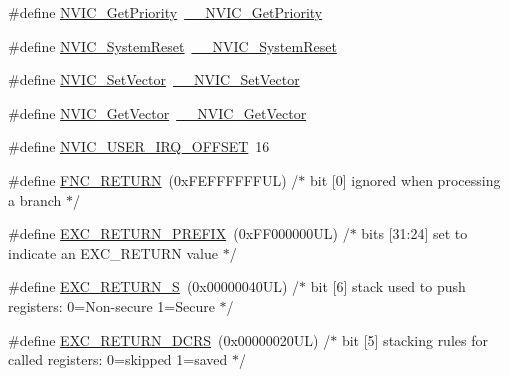 \begin{DoxyCompactItemize}
\item 
\#define \hyperlink{group___c_m_s_i_s___core___n_v_i_c_functions_gaf59b9d0a791d2157abb319753953eceb}{N\+V\+I\+C\+\_\+\+Get\+Priority}~\hyperlink{group___c_m_s_i_s___core___n_v_i_c_functions_gaeb9dc99c8e7700668813144261b0bc73}{\+\_\+\+\_\+\+N\+V\+I\+C\+\_\+\+Get\+Priority}
\item 
\#define \hyperlink{group___c_m_s_i_s___core___n_v_i_c_functions_ga6aa0367d3642575610476bf0366f0c48}{N\+V\+I\+C\+\_\+\+System\+Reset}~\hyperlink{group___c_m_s_i_s___core___n_v_i_c_functions_ga0d9aa2d30fa54b41eb780c16e35b676c}{\+\_\+\+\_\+\+N\+V\+I\+C\+\_\+\+System\+Reset}
\item 
\#define \hyperlink{group___c_m_s_i_s___core___n_v_i_c_functions_ga804af63bb4c4c317387897431814775d}{N\+V\+I\+C\+\_\+\+Set\+Vector}~\hyperlink{group___c_m_s_i_s___core___n_v_i_c_functions_ga0df355460bc1783d58f9d72ee4884208}{\+\_\+\+\_\+\+N\+V\+I\+C\+\_\+\+Set\+Vector}
\item 
\#define \hyperlink{group___c_m_s_i_s___core___n_v_i_c_functions_ga955eb1c33a3dcc62af11a8385e8c0fc8}{N\+V\+I\+C\+\_\+\+Get\+Vector}~\hyperlink{group___c_m_s_i_s___core___n_v_i_c_functions_ga44b665d2afb708121d9b10c76ff00ee5}{\+\_\+\+\_\+\+N\+V\+I\+C\+\_\+\+Get\+Vector}
\item 
\#define \hyperlink{group___c_m_s_i_s___core___n_v_i_c_functions_ga8045d905a5ca57437d8e6f71ffcb6df5}{N\+V\+I\+C\+\_\+\+U\+S\+E\+R\+\_\+\+I\+R\+Q\+\_\+\+O\+F\+F\+S\+ET}~16
\item 
\#define \hyperlink{group___c_m_s_i_s___core___n_v_i_c_functions_gabaa62910bf89acc186ae998c611e64ab}{F\+N\+C\+\_\+\+R\+E\+T\+U\+RN}~(0x\+F\+E\+F\+F\+F\+F\+F\+F\+U\+L)     /$\ast$ bit \mbox{[}0\mbox{]} ignored when processing a branch                             $\ast$/
\item 
\#define \hyperlink{group___c_m_s_i_s___core___n_v_i_c_functions_ga99e0c1c19f050880a8bd827a7f420bec}{E\+X\+C\+\_\+\+R\+E\+T\+U\+R\+N\+\_\+\+P\+R\+E\+F\+IX}~(0x\+F\+F000000\+U\+L)     /$\ast$ bits \mbox{[}31\+:24\mbox{]} set to indicate an E\+X\+C\+\_\+\+R\+E\+T\+U\+R\+N value                     $\ast$/
\item 
\#define \hyperlink{group___c_m_s_i_s___core___n_v_i_c_functions_ga88711355d0196b1ffeb18c33e2c95360}{E\+X\+C\+\_\+\+R\+E\+T\+U\+R\+N\+\_\+S}~(0x00000040\+U\+L)     /$\ast$ bit \mbox{[}6\mbox{]} stack used to push registers\+: 0=\+Non-\/secure 1=\+Secure          $\ast$/
\item 
\#define \hyperlink{group___c_m_s_i_s___core___n_v_i_c_functions_ga0a0f2c03b4aef2c02bdae044bda1324b}{E\+X\+C\+\_\+\+R\+E\+T\+U\+R\+N\+\_\+\+D\+C\+RS}~(0x00000020\+U\+L)     /$\ast$ bit \mbox{[}5\mbox{]} stacking rules for called registers\+: 0=skipped 1=saved       $\ast$/

\end{DoxyCompactItemize}
